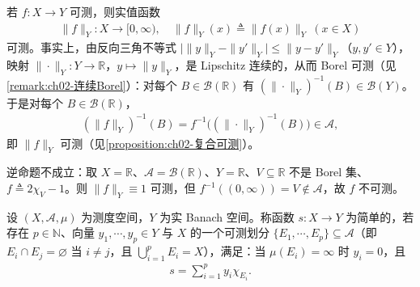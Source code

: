 \documentclass[../../main.tex]{subfiles}%
\begin{document}
\begin{remark}\label{remark:ch04-范数可测}
若 $f:X\to Y$ 可测，则实值函数
\begin{align}
\|f\|_Y:X\to[0,\infty),\quad \|f\|_Y(x)\triangleq \|f(x)\|_Y\ (x\in X) \label{align:ch04-4.5}
\end{align}
可测。事实上，由反向三角不等式 $\big|\|y\|_Y-\|y'\|_Y\big|\leqslant\|y-y'\|_Y$（$y,y'\in Y$），映射 $\|\cdot\|_Y:Y\to\mathbb{R}$，$y\mapsto\|y\|_Y$，是 Lipschitz 连续的，从而 Borel 可测（见\cref{remark:ch02-连续Borel}）：对每个 $B\in\mathcal{B}(\mathbb{R})$ 有 $(\|\cdot\|_Y)^{-1}(B)\in\mathcal{B}(Y)$。于是对每个 $B\in\mathcal{B}(\mathbb{R})$，
\begin{align*}
(\|f\|_Y)^{-1}(B)=f^{-1}\big((\|\cdot\|_Y)^{-1}(B)\big)\in\mathcal{A},
\end{align*}
即 $\|f\|_Y$ 可测（见\cref{proposition:ch02-复合可测}）。

逆命题不成立：取 $X=\mathbb{R}$、$\mathcal{A}=\mathcal{B}(\mathbb{R})$、$Y=\mathbb{R}$、$V\subseteq\mathbb{R}$ 不是 Borel 集、$f\triangleq2\chi_V-1$。则 $\|f\|_Y\equiv1$ 可测，但 $f^{-1}((0,\infty))=V\notin\mathcal{A}$，故 $f$ 不可测。
\end{remark}

\begin{definition}[简单函数]\label{definition:ch04-简单函数}
设 $(X,\mathcal{A},\mu)$ 为测度空间，$Y$ 为实 Banach 空间。称函数 $s:X\to Y$ 为简单的，若存在 $p\in\mathbb{N}$、向量 $y_1,\cdots ,y_p\in Y$ 与 $X$ 的一个可测划分 $\{E_1,\cdots ,E_p\}\subseteq\mathcal{A}$（即 $E_i\cap E_j=\varnothing$ 当 $i\neq j$，且 $\bigcup_{i=1}^pE_i=X$），满足：当 $\mu(E_i)=\infty$ 时 $y_i=0$，且
\begin{align*}
s=\sum_{i=1}^p y_i\chi_{E_i}.
\end{align*}
\end{definition}
\end{document}
